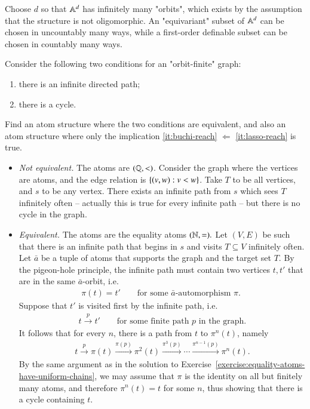 \exercisepart


{
	Choose $d$ so that $\mathbb A^d$ has infinitely many "orbits", which exists by the assumption that the structure is not oligomorphic.  An "equivariant" subset of $\mathbb A^d$ can be chosen in uncountably many ways, while a first-order definable subset can be chosen in countably many ways. 
}


\mikexercise
{\label{ex:buchi-reachability-lasso} Consider the following two conditions for an "orbit-finite" graph:
\begin{enumerate}
	\item \label{it:buchi-reach} there is an infinite directed path; 
	\item \label{it:lasso-reach} there is a cycle.
\end{enumerate}
Find an atom structure where the two conditions are equivalent, and also an atom structure where only the implication \ref{it:buchi-reach} $\Leftarrow$ \ref{it:lasso-reach} is true.
}{
\begin{itemize}
	\item \emph{Not equivalent.} The atoms are $(\mathbb Q, <)$. Consider the graph where the vertices are atoms, and the edge relation is $\{(v,w): v < w\}$. Take $T$ to be all vertices, and $s$ to be any vertex. There exists an infinite path from $s$ which sees $T$ infinitely often -- actually this is true for every infinite path -- but there is no cycle in the graph. 
	\item \emph{Equivalent.} The atoms are the equality atoms $({\mathbb N},=).$ Let $(V,E)$ be such that there is an infinite path that begins in $s$ and visits $T \subseteq V$ infinitely often. Let $\bar a$ be a tuple of atoms that supports the graph and the target set $T$. By the pigeon-hole principle, the infinite path must contain two vertices $t,t'$ that are in the same $\bar a$-orbit, i.e.
	\begin{align*}
		\pi(t) = t' \qquad \text{for some $\bar a$-automorphism $\pi$. }
	\end{align*}
	Suppose that $t'$ is visited first by the infinite path, i.e.
	\begin{align*}
		t \stackrel{p} \to t' \qquad \text{for some finite path $p$ in the graph.}
	\end{align*}
	It follows that for every $n$, there is a path from $t$ to $\pi^n(t)$, namely
	\begin{align*}
		t \stackrel{p} \to \pi(t) \stackrel{\pi(p)} \to \pi^2(t) \stackrel{\pi^3(p)} \to \cdots \stackrel{\pi^{n-1}(p)} \to \pi^n(t).
	\end{align*}
	By the same argument as in the solution to Exercise~\ref{exercise:equality-atoms-have-uniform-chains}, we may assume that $\pi$ is the identity on all but finitely many atoms, and therefore $\pi^n(t)=t$ for some $n$, thus showing that there is a cycle containing $t$.
\end{itemize}	 
} 


